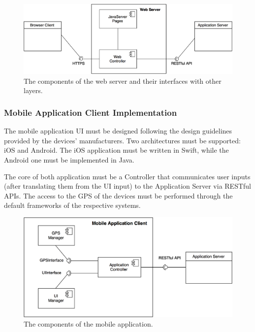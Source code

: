 \begin{figure}[H]
\begin{center}
		\includegraphics[width=\textwidth]{./arch_design/diagrams/web_server.png}
		\caption{The components of the web server and their interfaces with other layers.}
		\label{web_server}
\end{center}
\end{figure}

\subsubsection{Mobile Application Client Implementation}
The mobile application UI must be designed following the design guidelines provided by the devices' manufacturers. Two architectures must be supported: iOS and Android. The iOS application must be written in Swift, while the Android one must be implemented in Java.

The core of both application must be a Controller that communicates user inputs (after translating them from the UI input) to the Application Server via RESTful APIs. The access to the GPS of the devices must be performed through the default frameworks of the respective systems.

\begin{figure}[H]
\begin{center}
		\includegraphics[width=\textwidth]{./arch_design/diagrams/mobile_app_comps.png}
		\caption{The components of the mobile application.}
		\label{mobile_app_comps}
\end{center}
\end{figure}

